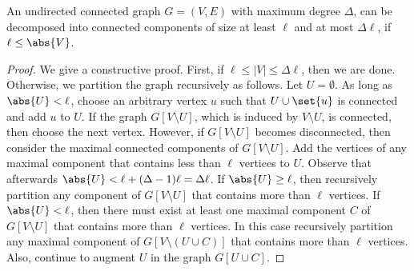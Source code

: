 \begin{lemma}
\label{lemma:dec}
An undirected connected graph $G = (V,E)$ with maximum degree
$\Delta$, can be decomposed into connected components of size at least
$\ell$ and at most $\Delta \ell$, if $\ell \leq \abs{V}$.
\end{lemma}
\begin{proof}%
We give a constructive proof.
%
First, if $\ell \leq |V| \leq \Delta \ell$, then we are done.
%
Otherwise, we partition the graph recursively as follows.  Let $U
= \emptyset$.  As long as $\abs{U} < \ell$, choose an arbitrary vertex
$u$ such that $U \cup \set{u}$ is connected and add $u$ to $U$.
%
If the graph $G[V \setminus U]$, which is induced by $V \setminus U$,
is connected, then choose the next vertex.
%
However, if $G[V \setminus U]$ becomes disconnected, then consider the
maximal connected components of $G[V \setminus U]$.  Add the vertices
of any maximal component that contains less than $\ell$ vertices to
$U$.  Observe that afterwards $\abs{U} < \ell + (\Delta-1) \ell
= \Delta \ell$.
%
If $\abs{U} \geq \ell$, then recursively partition any component of
$G[V \setminus U]$ that contains more than $\ell$ vertices.
%
If $\abs{U} < \ell$, then there must exist at least one maximal
component $C$ of $G[V \setminus U]$ that contains more than $\ell$
vertices.  In this case recursively partition any maximal component of
$G[V \setminus (U \cup C)]$ that contains more than $\ell$ vertices.
Also, continue to augment $U$ in the graph $G[U \cup C]$.
\end{proof}



